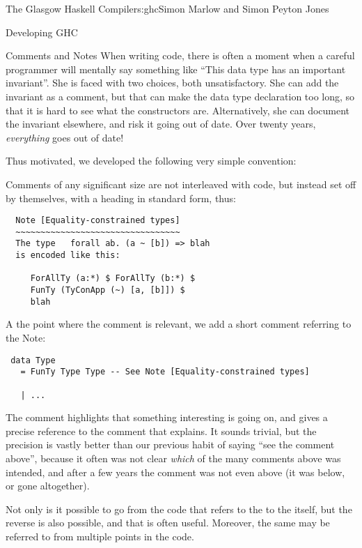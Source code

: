 \begin{aosachapter}{The Glasgow Haskell Compiler}{s:ghc}{Simon Marlow and Simon Peyton Jones}
\begin{aosasect1}{Developing GHC}
\begin{aosasect2}{Comments and Notes}
When writing code, there is often a moment when a careful programmer
will mentally say something like ``This data type has an important
invariant''.  She is faced with two choices, both unsatisfactory.  She
can add the invariant as a comment, but that can make the data type
declaration too long, so that it is hard to see what the constructors
are.  Alternatively, she can document the invariant elsewhere, and
risk it going out of date.  Over twenty years, \emph{everything} goes
out of date!

Thus motivated, we developed the following very simple convention:

\begin{aosaitemize}

\item Comments of any significant size are not interleaved with code,
  but instead set off by themselves, with a heading in standard form,
  thus:

\begin{verbatim}
  Note [Equality-constrained types]
  ~~~~~~~~~~~~~~~~~~~~~~~~~~~~~~~~~
  The type   forall ab. (a ~ [b]) => blah
  is encoded like this:

     ForAllTy (a:*) $ ForAllTy (b:*) $
     FunTy (TyConApp (~) [a, [b]]) $
     blah
\end{verbatim}

\item A the point where the comment is relevant, we add a short
  comment referring to the Note:

\begin{verbatim}
 data Type
   = FunTy Type Type -- See Note [Equality-constrained types]

   | ...
\end{verbatim}

  The comment highlights that something interesting is going on, and
  gives a precise reference to the comment that explains.  It sounds
  trivial, but the precision is vastly better than our previous habit
  of saying ``see the comment above'', because it often was not clear
  \emph{which} of the many comments above was intended, and after a
  few years the comment was not even above (it was below, or gone
  altogether).

\end{aosaitemize}

Not only is it possible to go from the code that refers to the
 to the  itself, but the reverse is also
possible, and that is often useful.  Moreover, the same 
may be referred to from multiple points in the code.


\end{aosasect2}
\end{aosasect1}
\end{aosachapter}
